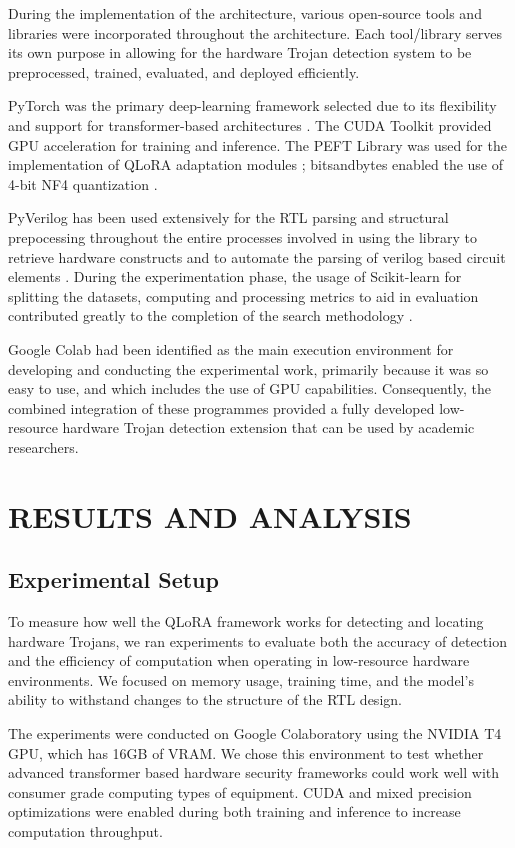 \documentclass[12pt,a4paper]{report}
\begin{document}
During the implementation of the architecture, various open-source tools and libraries were incorporated throughout the architecture. Each tool/library serves its own purpose in allowing for the hardware Trojan detection system to be preprocessed, trained, evaluated, and deployed efficiently.

PyTorch was the primary deep-learning framework selected due to its flexibility and support for transformer-based architectures \cite{ref10}. The CUDA Toolkit provided GPU acceleration for training and inference. The PEFT Library was used for the implementation of QLoRA adaptation modules \cite{ref13}; bitsandbytes enabled the use of 4-bit NF4 quantization \cite{ref9}.

PyVerilog has been used extensively for the RTL parsing and structural prepocessing throughout the entire processes involved in using the library to retrieve hardware constructs and to automate the parsing of verilog based circuit elements \cite{ref12}. During the experimentation phase, the usage of Scikit-learn for splitting the datasets, computing and processing metrics to aid in evaluation contributed greatly to the completion of the search methodology \cite{ref14}.

Google Colab had been identified as the main execution environment for developing and conducting the experimental work, primarily because it was so easy to use, and which includes the use of GPU capabilities. Consequently, the combined integration of these programmes provided a fully developed low-resource hardware Trojan detection extension that can be used by academic researchers.


\chapter{RESULTS AND ANALYSIS}

\section{Experimental Setup}

To measure how well the QLoRA framework works for detecting and locating hardware Trojans, we ran experiments to evaluate both the accuracy of detection and the efficiency of computation when operating in low-resource hardware environments. We focused on memory usage, training time, and the model's ability to withstand changes to the structure of the RTL design.

The experiments were conducted on Google Colaboratory using the NVIDIA T4 GPU, which has 16GB of VRAM. We chose this environment to test whether advanced transformer based hardware security frameworks could work well with consumer grade computing types of equipment. CUDA and mixed precision optimizations were enabled during both training and inference to increase computation throughput.
\end{document}
